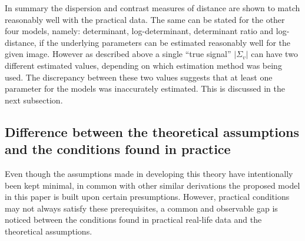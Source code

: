 \documentclass[journal,12pt,draftcls,onecolumn]{IEEEtran}
\begin{document}
In summary the dispersion and contrast measures of distance are shown to match reasonably well with the practical data.
The same can be stated for the other four models, namely: determinant, log-determinant, determinant ratio and log-distance,
  if the underlying parameters can be estimated reasonably well for the given image.   
However as described above a single ``true signal'' $|\Sigma_v|$ can have two different estimated values,
  depending on which estimation method was being used.
The discrepancy between these two values suggests that at least one parameter for the models was inaccurately estimated.
This is discussed in the next subsection.


\subsection{Difference between the theoretical assumptions and the conditions found in practice}  
\label{sec:improve_the_match_bw_theory_practice}

Even though the assumptions made in developing this theory have intentionally been kept minimal, 
in common with other similar derivations the proposed model in this paper is built upon certain presumptions.
However, practical conditions may not always satisfy these prerequisites,
  a common and observable gap is noticed between the conditions found in practical real-life data and the theoretical assumptions.
\end{document}
